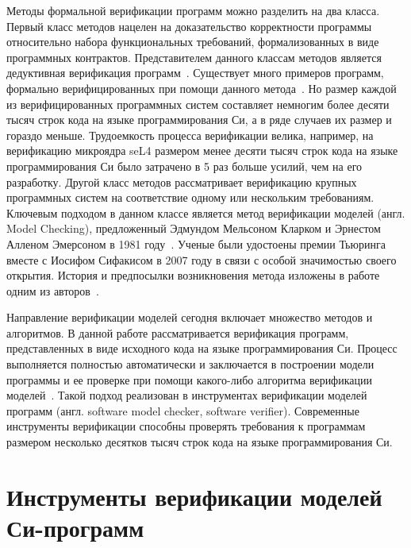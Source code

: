 Методы формальной верификации программ можно разделить на два класса.
Первый класс методов нацелен на доказательство корректности программы относительно набора функциональных требований, формализованных в виде программных контрактов.
Представителем данного классам методов является дедуктивная верификация программ~\cite{Floyd1993, Hoare:1969:ABC}.
Существует много примеров программ, формально верифицированных при помощи данного метода~\cite{Leroy:2009:FVR, seL4, CoCon, CakeML, Davis2015, HOL, FSCQ, CertiKOS}.
Но размер каждой из верифицированных программных систем составляет немногим более десяти тысяч строк кода на языке программирования Си, а в ряде случаев их размер и гораздо меньше.
Трудоемкость процесса верификации велика, например, на верификацию микроядра seL4 размером менее десяти тысяч строк кода на языке программирования Си было затрачено в 5 раз больше усилий, чем на его разработку.
Другой класс методов рассматривает верификацию крупных программных систем на соответствие одному или нескольким требованиям.
Ключевым подходом в данном классе является метод верификации моделей (англ. Model Checking), предложенный Эдмундом Мельсоном Кларком и Эрнестом Алленом Эмерсоном в 1981 году~\cite{MC}.
Ученые были удостоены премии Тьюринга вместе с Иосифом Сифакисом в 2007 году в связи с особой значимостью своего открытия.
История и предпосылки возникновения метода изложены в работе одним из авторов~\cite{Clarke:2008:BMC}.

Направление верификации моделей сегодня включает множество методов и алгоритмов.
В данной работе рассматривается верификация программ, представленных в виде исходного кода на языке программирования Си.
Процесс выполняется полностью автоматически и заключается в построении модели программы и ее проверке при помощи какого-либо алгоритма верификации моделей~\cite{DSilva:2008:SAT}.
Такой подход реализован в инструментах верификации моделей программ (англ. software model checker, software verifier).
Современные инструменты верификации способны проверять требования к программам размером несколько десятков тысяч строк кода на языке программирования Си.


\section{Инструменты верификации моделей Си-программ}

